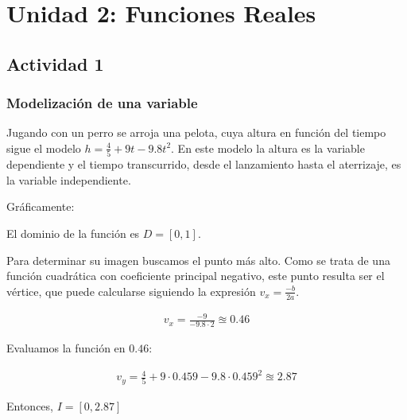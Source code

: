 \section*{Unidad 2: Funciones Reales}

\subsection*{Actividad 1}
\subsubsection*{Modelización de una variable}

Jugando con un perro se arroja una pelota, 
cuya altura en función del tiempo sigue el modelo $h = \frac{4}{5} + 9t - 9.8t^2$. 
En este modelo la altura es la variable dependiente y el tiempo transcurrido, 
desde el lanzamiento hasta el aterrizaje, 
es la variable independiente.

Gráficamente:

\begin{center}
\end{center}

El dominio de la función es $D = [0,1]$.

Para determinar su imagen buscamos el punto más alto.
Como se trata de una función cuadrática con coeficiente principal negativo,
este punto resulta ser el vértice,
que puede calcularse siguiendo la expresión $v_{x} = \frac{-b}{2a}$.

\begin{align*}
    v_{x} = \frac{-9}{-9.8 \cdot 2} \approxeq 0.46
\end{align*}

Evaluamos la función en $0.46$:

\begin{align*}
    v_{y} = \frac{4}{5} + 9 \cdot 0.459 - 9.8 \cdot 0.459^2 \approxeq 2.87
\end{align*}

Entonces, $I = [0, 2.87]$
